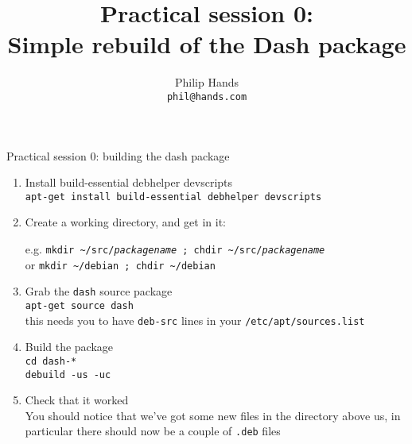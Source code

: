 \documentclass[10pt,final]{beamer}
\title[Practical session 0: dash]{Practical session 0:\\ Simple rebuild of the Dash package}
\author[]{Philip Hands\\{\small\texttt{phil@hands.com}}}
\institute{\texttt{[image: figs/openlogo-nd.pdf]}}
\date{}
\begin{document}
\frame{\titlepage}

\begin{frame}{Practical session 0: building the dash package}
\begin{enumerate}
\item Install build-essential debhelper devscripts\\
  {\small \texttt{apt-get install build-essential debhelper devscripts}}
  \hbr
\item Create a working directory, and get in it:\\
  \begin{tabbing}
    e.g. \= \texttt{mkdir \textasciitilde/src/\textsl{packagename} ; chdir \textasciitilde/src/\textsl{packagename}}\\
    or   \> \texttt{mkdir \textasciitilde/debian ; chdir \textasciitilde/debian}
  \end{tabbing}
  
\item Grab the \texttt{dash} source package\\
  \texttt{apt-get source dash}\\ 
  {\small this needs you to have \texttt{deb-src} lines in your \texttt{/etc/apt/sources.list}}
\item Build the package\\
  {\small \texttt{cd dash-*\\ debuild -us -uc}}

\item Check that it worked\\
  {\small You should notice that we've got some new
    files in the directory above us, in particular
    there should now be a couple of \texttt{.deb}
    files}
\end{enumerate}
\end{frame}
\end{document}
